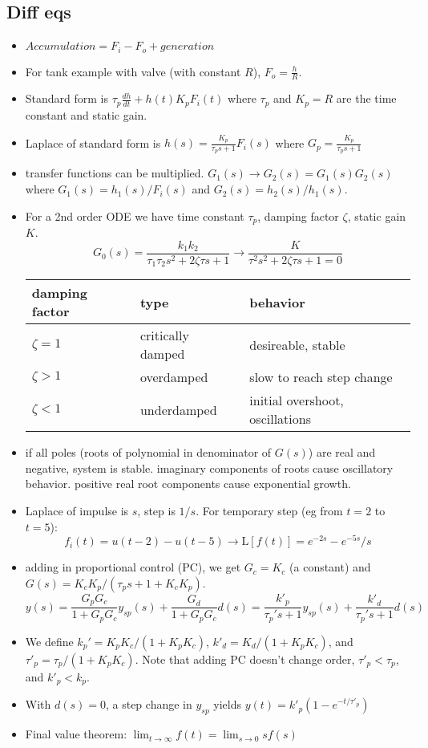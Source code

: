 \documentclass{article}
\begin{document}
\begin{multicols*}{2}
\section{Diff eqs}
\begin{itemize}
    \setlength\itemsep{0em}
    \item $Accumulation = F_i - F_o + generation$
    \item For tank example with valve (with constant $R$), $F_o = \frac{h}{R}$.
    \item Standard form is $\tau_p \frac{dh}{dt} + h(t) K_pF_i(t)$ where $\tau_p$ and $K_p = R$ are the time constant and static gain.
    \item Laplace of standard form is $h(s) = \frac{K_p}{\tau_ps+1}F_i(s)$ where $G_p = \frac{K_p}{\tau_ps+1}$
    \item transfer functions can be multiplied. $G_1(s) \rightarrow G_2(s) = G_1(s)G_2(s)$ where $G_1(s) = h_1(s)/F_i(s)$ and $G_2(s) = h_2(s)/h_1(s)$.
    \item For a 2nd order ODE we have time constant $\tau_p$, damping factor $\zeta$, static gain $K$.
        $$ G_0(s) = \frac{k_1k_2}{\tau_1\tau_2s^2+2\zeta\tau s + 1} \rightarrow \frac{K}{\tau^2s^2+2\zeta\tau s + 1 = 0} $$
        \def\arraystretch{1}
        \begin{tabular}{l l l}
        \textbf{damping factor} & \textbf{type} & \textbf{behavior} \\
            \hline
            $\zeta = 1$ & critically damped & desireable, stable\\
            $\zeta > 1$ & overdamped & slow to reach step change\\
            $\zeta < 1$ & underdamped & initial overshoot, oscillations\\
        \end{tabular}
    \item if all poles (roots of polynomial in denominator of $G(s)$) are real and negative, system is stable. imaginary components of roots cause oscillatory behavior. positive real root components cause exponential growth.
    \item Laplace of impulse is $s$, step is $1/s$. For temporary step (eg from $t=2$ to $t=5$):
        $$f_i(t) = u(t-2) - u(t-5) \rightarrow \mathrm{L}[f(t)]=e^{-2s}-e^{-5s}/s$$
    \item adding in proportional control (PC), we get $G_c = K_c$ (a constant) and $G(s) = K_cK_p / (\tau_ps+1+K_cK_p)$.
        $$ y(s) =  \frac{G_pG_c}{1 + G_pG_c} y_{sp}(s) + \frac{G_d}{1+G_pG_c}d(s) = \frac{k'_p}{\tau_p's+1}y_{sp}(s) + \frac{k'_d}{\tau_p's+1}d(s)$$
    \item We define $k_p'=K_pK_c/(1+K_pK_c)$, $k'_d = K_d/(1+K_pK_c)$, and $\tau'_p = \tau_p/(1+K_pK_c)$. Note that adding PC doesn't change order, $\tau'_p < \tau_p$, and $k'_p < k_p$.
    \item With $d(s)=0$, a step change in $y_{sp}$ yields $y(t)=k'_p(1 - e^{-t / \tau'_p})$
    \item Final value theorem: $\lim_{t \to \infty} f(t) = \lim_{s \to 0}sf(s)$



\end{itemize}
\end{multicols*}
\end{document}

